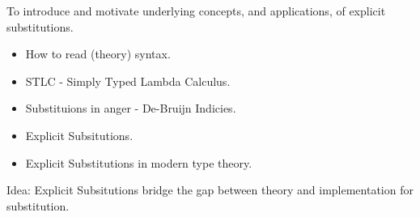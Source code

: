 To introduce and motivate underlying concepts, and applications,
of explicit substitutions.

\begin{itemize}
  \item How to read (theory) syntax.
  \item STLC - Simply Typed Lambda Calculus.
  \item Substituions in anger - De-Bruijn Indicies.
  \item Explicit Subsitutions.
  \item Explicit Substitutions in modern type theory.
\end{itemize}
Idea: Explicit Subsitutions bridge the gap between theory and 
      implementation for substitution.

